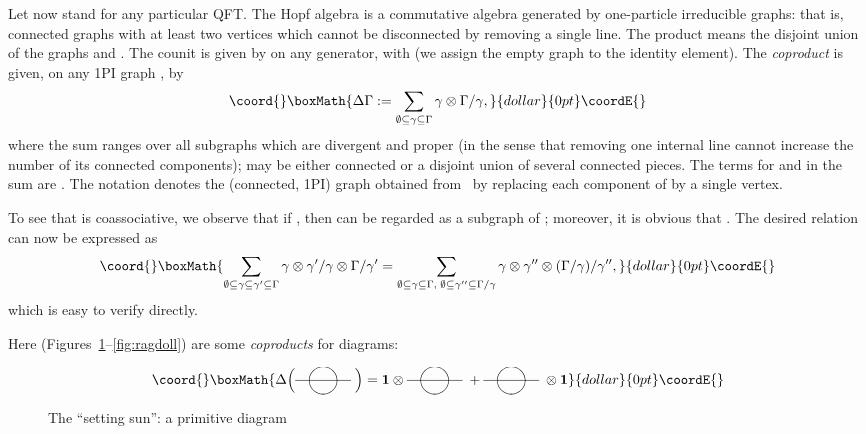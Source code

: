 \documentclass[a4paper,12pt]{article}
\providecommand{\Dl}{\Delta}            %
\providecommand{\eps}{\varepsilon}      %
\providecommand{\Ga}{\Gamma}            %
\providecommand{\ga}{\gamma}            %
\DeclareMathOperator{\id}{id}       %
\providecommand{\ox}{\otimes}           %
\providecommand{\1}{\mathbf{1}}         %
\providecommand{\7}{\dagger}            %
\providecommand{\8}{\bullet}            %
\renewcommand{\.}{\cdot}            %
\renewcommand{\:}{\colon}           %
\providecommand{\sunset}{%
\parbox{15mm}{\begin{picture}(20,10)
\put(0,5){\line(1,0){10}}
\put(20,5){\circle{20}}
\put(10,5){\line(1,0){30}}
\end{picture}}
}
\begin{document}
Let now \myHighlight{$\Phi$}\coordHE{} stand for any particular QFT. The Hopf algebra \coordHE{}
is a commutative algebra generated by one-particle irreducible graphs:
that is, connected graphs with at least two vertices which cannot be
disconnected by removing a single line. The product \myHighlight{$\Ga_1 \Ga_2$}\coordHE{}
means the disjoint union of the graphs \myHighlight{$\Ga_1$}\coordHE{} and \myHighlight{$\Ga_2$}\coordHE{}. The counit
is given by \myHighlight{$\eps(\Ga) := 0$}\coordHE{} on any generator, with
\myHighlight{$\eps(\emptyset) := 1$}\coordHE{} (we assign the empty graph to the identity
element). The \textit{coproduct} \myHighlight{$\Dl$}\coordHE{} is given, on any 1PI graph
\myHighlight{$\Ga$}\coordHE{}, by
$$\coord{}\boxMath{
\Dl\Ga := \sum_{\emptyset\subseteq\ga\subseteq\Ga} \ga \ox \Ga/\ga,
}{dollar}{0pt}\coordE{}$$
where the sum ranges over all subgraphs which are divergent and proper
(in the sense that removing one internal line cannot increase the
number of its connected components); \myHighlight{$\ga$}\coordHE{} may be either connected or
a disjoint union of several connected pieces. The terms for
\myHighlight{$\ga = \emptyset$}\coordHE{} and \myHighlight{$\ga = \Ga$}\coordHE{} in the sum are
\myHighlight{$\Ga \ox 1 + 1 \ox \Ga$}\coordHE{}. The notation \myHighlight{$\Ga/\ga$}\coordHE{} denotes the
(connected, 1PI) graph obtained from~\myHighlight{$\Ga$}\coordHE{} by replacing each component
of \myHighlight{$\ga$}\coordHE{} by a single vertex.

To see that \myHighlight{$\Dl$}\coordHE{} is coassociative, we observe that if
\myHighlight{$\ga \subseteq \ga' \subseteq \Ga$}\coordHE{}, then \myHighlight{$\ga'/\ga$}\coordHE{} can be regarded as
a subgraph of \myHighlight{$\Ga/\ga$}\coordHE{}; moreover, it is obvious that
\myHighlight{$(\Ga/\ga)/(\ga'/\ga) \simeq \Ga/\ga'$}\coordHE{}. The desired relation
\myHighlight{$(\Dl \ox \id)(\Dl\Ga) = (\id \ox \Dl)(\Dl\Ga)$}\coordHE{} can now be expressed
as
$$\coord{}\boxMath{
\sum_{\emptyset\subseteq\ga\subseteq\ga'\subseteq\Ga}
 \ga \ox \ga'/\ga \ox \Ga/\ga'
 = \sum_{\emptyset\subseteq\ga\subseteq\Ga,\;
         \emptyset\subseteq\ga''\subseteq\Ga/\ga}
    \ga \ox \ga'' \ox (\Ga/\ga)/\ga'',
}{dollar}{0pt}\coordE{}$$
which is easy to verify directly.


Here (Figures~\ref{fig:sunset}--\ref{fig:ragdoll}) are some
\textit{coproducts} for \coordHE{} diagrams:

\begin{figure}[htb]
\centering
$$\coord{}\boxMath{
\Dl \Bigl( \sunset \Bigr) = \1 \ox \sunset + \sunset \ox \1
}{dollar}{0pt}\coordE{}$$
\caption{The ``setting sun'': a primitive diagram}
\label{fig:sunset}
\end{figure}
\end{document}

